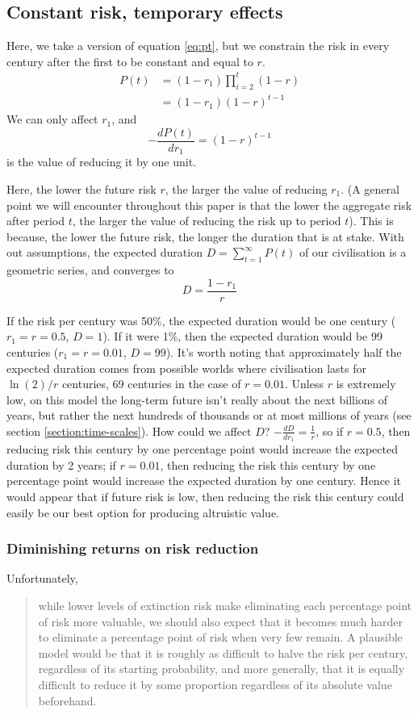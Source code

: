 \documentclass[british]{article}
\begin{document}
\subsection{Constant risk, temporary effects}\label{cr-te}


Here, we take a version of equation \ref{eq:pt}, but we constrain the risk in every century after the first to be constant and equal to $r$.
\begin{align*}
P(t) &= (1-r_1) \prod_{i=2}^{t}(1-r) \\
&= (1-r_1)(1-r)^{t-1}
\end{align*}
We can only affect $r_1$, and \[-\frac{dP(t)}{dr_1} = (1-r) ^{t-1}\] is the value of reducing it by one unit.

Here, the lower the future risk \(r\), the larger the value of reducing
\(r_1\). (A general point we will encounter throughout this paper is that the lower the aggregate risk after period $t$, the larger the value of reducing the risk up to period $t$). This is because, the lower the future risk, the longer the duration that is at stake. With out assumptions, the expected duration $D=\sum_{t=1}^\infty P(t)$ of our civilisation is a geometric series, and converges to $$D=\frac{1-r_1}{r}$$

If the risk per century was 50\%, the expected duration would be one century ($r_1=r=0.5$, $D=1$). If it were 1\%, then the expected duration would be 99 centuries ($r_1=r=0.01$, $D=99$). It's worth noting that approximately half the expected duration comes from possible worlds where civilisation lasts for $\ln(2)/r$ centuries, 69 centuries in the case of $r=0.01$. Unless $r$ is extremely low, on this model the long-term future isn't really about the next billions of years, but rather the next hundreds of thousands or at most millions of years (see section \ref{section:time-scales}). How could we affect $D$? $-\frac{dD}{dr_1}=\frac{1}{r}$, so if $r=0.5$, then reducing risk this century by one percentage point would increase the expected duration by 2 years; if $r=0.01$, then reducing the risk this century by one percentage point would increase the expected duration by one century. Hence it would appear that if future risk is low, then reducing the risk this century could easily be our best option for producing altruistic value.

\subsubsection{Diminishing returns on risk reduction}\label{header-n123} Unfortunately, 
\begin{quote}
while lower levels of extinction risk make eliminating each percentage point of risk more valuable, we should also expect that it becomes much
harder to eliminate a percentage point of risk when very few remain. A plausible model would be that it is roughly as difficult to
halve the risk per century, regardless of its starting probability, and
more generally, that it is equally difficult to reduce it by some
proportion regardless of its absolute value beforehand. \citep{ord_modelling_2014}
\end{quote}
\end{document}
